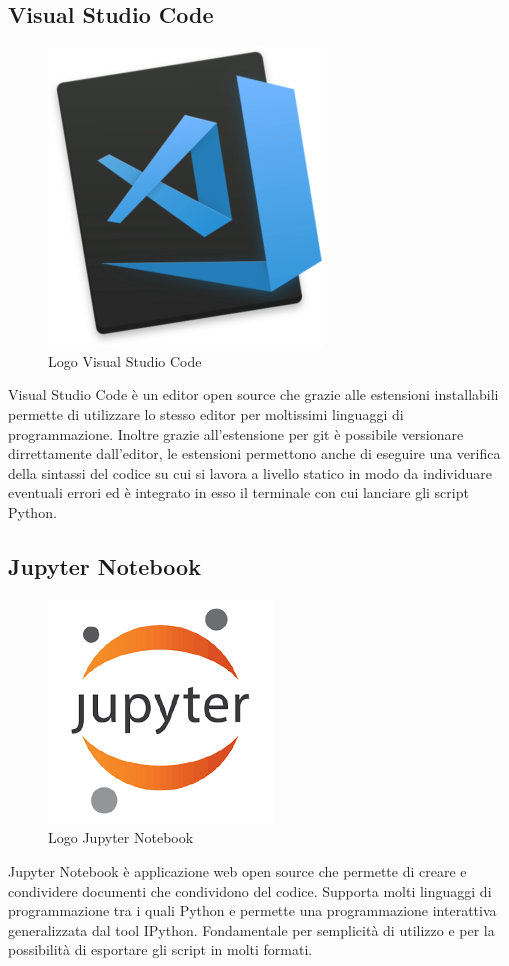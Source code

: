 \subsection{Visual Studio Code}
\begin{figure}[H]
	\begin{center} \includegraphics[scale=0.2]{figures/Visual_Studio_code}
		\caption[Logo Visual Studio Code]{Logo Visual Studio Code}
	\end{center}
\end{figure}
Visual Studio Code è un editor open source che grazie alle estensioni installabili permette di utilizzare lo stesso editor per moltissimi linguaggi di programmazione. Inoltre grazie all'estensione per git è possibile versionare dirrettamente dall'editor, le estensioni permettono anche di eseguire una verifica della sintassi del codice su cui si lavora a livello statico in modo da individuare eventuali errori ed è integrato in esso il terminale con cui lanciare gli script Python.

\subsection{Jupyter Notebook}
\begin{figure}[H]
	\begin{center} \includegraphics[scale=0.2]{figures/jupyter}
		\caption[Logo Jupyter Notebook]{Logo Jupyter Notebook}
	\end{center}
\end{figure}
Jupyter Notebook è applicazione web open source che permette di creare e condividere documenti che condividono del codice. Supporta molti linguaggi di programmazione tra i quali Python e permette una programmazione interattiva generalizzata dal tool IPython. Fondamentale per semplicità di utilizzo e per la possibilità di esportare gli script in molti formati.

